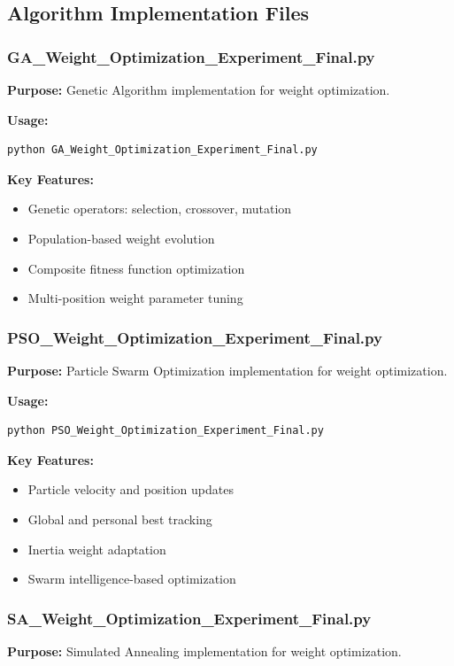 \subsection{Algorithm Implementation Files}

\subsubsection{GA\_Weight\_Optimization\_Experiment\_Final.py}
\textbf{Purpose:} Genetic Algorithm implementation for weight optimization.

\textbf{Usage:}
\begin{verbatim}
python GA_Weight_Optimization_Experiment_Final.py
\end{verbatim}

\textbf{Key Features:}
\begin{itemize}
\item Genetic operators: selection, crossover, mutation
\item Population-based weight evolution
\item Composite fitness function optimization
\item Multi-position weight parameter tuning
\end{itemize}

\subsubsection{PSO\_Weight\_Optimization\_Experiment\_Final.py}
\textbf{Purpose:} Particle Swarm Optimization implementation for weight optimization.

\textbf{Usage:}
\begin{verbatim}
python PSO_Weight_Optimization_Experiment_Final.py
\end{verbatim}

\textbf{Key Features:}
\begin{itemize}
\item Particle velocity and position updates
\item Global and personal best tracking
\item Inertia weight adaptation
\item Swarm intelligence-based optimization
\end{itemize}

\subsubsection{SA\_Weight\_Optimization\_Experiment\_Final.py}
\textbf{Purpose:} Simulated Annealing implementation for weight optimization.


